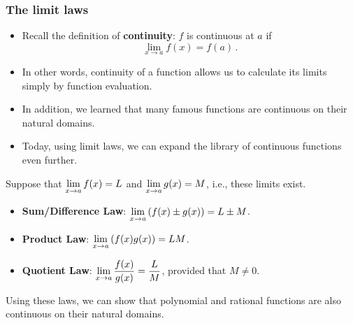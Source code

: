 \documentclass[10pt,t,presentation,ignorenonframetext,aspectratio=169]{beamer}
\title[\course]{\lecTitle}
\institute[Ohio State]
{
  \medskip
}
\date[\week]{\semester}
\author{Tae Eun Kim, Ph.D.}
\begin{document}
\begin{frame}
  \titlepage
\end{frame}


\begin{frame}
  \frametitle{The limit laws}
  \begin{itemize}
  \item Recall the definition of \textbf{continuity}: $f$ is continuous at $a$ if
    \[
      \lim_{x \to a} f(x) = f(a) \,.
    \]
  \item In other words, continuity of a function allows us to calculate its
    limits simply by function evaluation.
  \item In addition, we learned that many famous functions are
    continuous on their natural domains.
  \item Today, using limit laws, we can expand the library of
    continuous functions even further.
  \end{itemize}
\end{frame}

\begin{frame}
  \vs
  \begin{theorem}
    Suppose that $\displaystyle \lim_{x \to a} f(x) = L$ and
    $\displaystyle \lim_{x \to a} g(x) = M$, i.e., these limits exist.
    \begin{itemize}
    \item \textbf{Sum/Difference Law}: $\displaystyle \lim_{x \to a} \left( f(x) \pm
        g(x) \right) = L \pm M$.
    \item \textbf{Product Law}: $\displaystyle \lim_{x \to a} \left( f(x) g(x)
      \right) = L M$.
    \item \textbf{Quotient Law}: $\displaystyle \lim_{x \to a} \frac{f(x)}{g(x)} = \frac{L}{M}$,
      provided that $M \neq 0$.
    \end{itemize}
  \end{theorem}
  \vfill
  \begin{rmk}
    Using these laws, we can show that polynomial and rational
    functions are also continuous on their natural domains.
  \end{rmk}
\end{frame}
\end{document}
